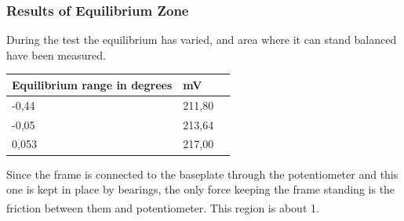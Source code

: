 \subsubsection{Results of Equilibrium Zone}
During the test the equilibrium has varied, and area where it can stand balanced have been measured. 

\begin{table}[H]
	\centering
	\begin{tabular}{|l|l|p{4.3cm}|}
		\hline%
		\textbf{Equilibrium range in degrees}       &  \textbf{mV}         \\
		\hline%
		-0,44                               			  & 211,80               \\
		\hline%
		-0,05                                          & 213,64               \\
		\hline%
		0,053 										  & 217,00              \\
		\hline%
	\end{tabular}
\end{table}


Since the frame is connected to the baseplate through the potentiometer and this one is kept in place by bearings, the only force keeping the frame standing is the friction between them and potentiometer. This region is about \si{1^{\circ}}.



